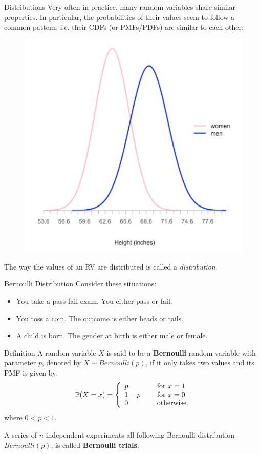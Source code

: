 \documentclass{beamer}
\newcommand{\PP}{\mathbb{P}}
\begin{document}
	
	\begin{frame}{Distributions}
		Very often in practice, many random variables share similar properties. In particular, the probabilities of their values seem to follow a common pattern, i.e. their CDFs (or PMFs/PDFs) are similar to each other:
		\begin{figure}
			\centering
			\includegraphics[width=0.45\linewidth]{0.35}
			\label{fig:0}
		\end{figure}
		\pause The way the values of an RV are distributed is called a \textit{distribution}.
		
		
	\end{frame}
	
	
	\begin{frame}{Bernoulli Distribution}
	Consider these situations:\pause
	\begin{itemize}[<+->]
\item You take a pass-fail exam. You either pass or fail.
\item You toss a coin. The outcome is either heads or tails.
\item A child is born. The gender at birth is either male or female.
	\end{itemize}
		
		\pause 
		\begin{block}{Definition}
			A random variable $X$ is said to be a \textbf{Bernoulli} random variable with parameter $p$, denoted by $X\sim Bernoulli(p)$, if it only takes two values and its PMF is given by:
			\begin{equation}
				\nonumber \PP(X=x) = \left\{
				\begin{array}{l l}
					p& \quad \text{ for } x=1\\
					1-p & \quad \text{ for } x=0\\
					0 & \quad \text{ otherwise}
				\end{array} \right.
			\end{equation}
			where $0<p<1$.
		\end{block}
		\pause 
					A series of $n$ independent experiments all following Bernoulli distribution $Bernoulli(p)$, is called \textbf{Bernoulli trials}.
	\end{frame}
	
\end{document}

